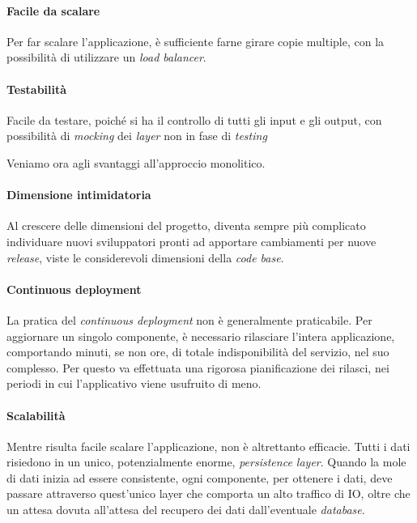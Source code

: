 \paragraph*{Facile da scalare} Per far scalare l'applicazione, è sufficiente farne girare copie multiple, con la possibilità di utilizzare un \textit{load balancer}.

\paragraph*{Testabilità} Facile da testare, poiché si ha il controllo di tutti gli input e gli output, con possibilità di \textit{mocking} dei \textit{layer}
non in fase di \textit{testing}

\bigskip
Veniamo ora agli svantaggi all'approccio monolitico.

\paragraph*{Dimensione intimidatoria} Al crescere delle dimensioni del progetto, diventa sempre più complicato individuare nuovi sviluppatori pronti ad apportare cambiamenti per nuove \textit{release},
viste le considerevoli dimensioni della \textit{code base}.

\paragraph*{Continuous deployment} La pratica del \textit{continuous deployment} non è generalmente praticabile.
Per aggiornare un singolo componente, è necessario rilasciare l'intera applicazione, comportando minuti, se non ore, di totale indisponibilità del
servizio, nel suo complesso.
Per questo va effettuata una rigorosa pianificazione dei rilasci, nei periodi in cui l'applicativo viene usufruito di meno.

\paragraph*{Scalabilità} Mentre risulta facile scalare l'applicazione, non è altrettanto efficacie. Tutti i dati risiedono in un unico, potenzialmente
enorme, \textit{persistence layer}. Quando la mole di dati inizia ad essere
consistente, ogni componente, per ottenere i dati, deve passare attraverso quest'unico layer che comporta un alto traffico di IO, oltre che un attesa dovuta all'attesa del recupero dei dati dall'eventuale \textit{database}.

